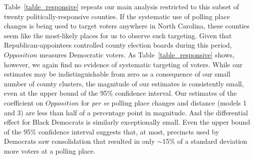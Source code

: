 \documentclass[12pt]{article}
\begin{document}
Table~\ref{table_responsive} repeats our main analysis restricted to this subset of twenty politically-responsive counties. If the systematic use of polling place changes is being used to target voters anywhere in North Carolina, these counties seem like the most-likely places for us to observe such targeting.  Given that Republican-appointees controlled county election boards during this period, $Opposition$ measures Democratic voters.  As Table~\ref{table_responsive} shows, however, we again find no evidence of systematic targeting of voters.  While our estimates may be indistinguishable from zero as a consequence of our small number of county clusters, the magnitude of our estimates is consistently small, even at the upper bound of the 95\% confidence interval.  Our estimates of the coefficient on $Opposition$ for \emph{per se} polling place changes and distance (models 1 and 3) are less than half of a percentage point in magnitude.  And the differential effect for Black Democrats is similarly exceptionally small.  Even the upper bound of the 95\% confidence interval suggests that, at most, precincts used by Democrats  saw consolidation that resulted in only $\sim$15\% of a standard deviation more voters at a polling place.
\end{document}
